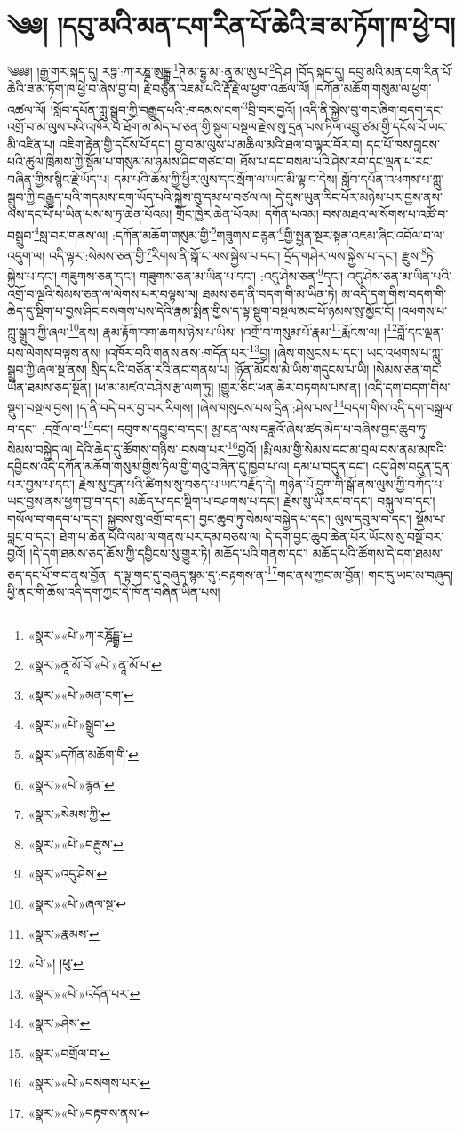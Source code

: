 \chapter{༄༅། །དབུ་མའི་མན་ངག་རིན་པོ་ཆེའི་ཟ་མ་ཏོག་ཁ་ཕྱེ་བ།}༄༅༅། །རྒྱ་གར་སྐད་དུ། རཏྣ་:ཀ་རཎྜ་ཨུངྒྷ་\footnote{«སྣར་»«པེ་»ཀ་རཎྜོངྒྷ་}ཊེ་མ་དྷྱ་མ་:ནཱ་མ་ཨུ་པ་\footnote{«སྣར་»ནཱ་མོ་བོ་«པེ་»ནཱ་མོ་པ་}དེ་ཤ །བོད་སྐད་དུ། དབུ་མའི་མན་ངག་རིན་པོ་ཆེའི་ཟ་མ་ཏོག་ཁ་ཕྱེ་བ་ཞེས་བྱ་བ། རྗེ་བཙུན་འཇམ་པའི་རྡོ་རྗེ་ལ་ཕྱག་འཚལ་ལོ། །དཀོན་མཆོག་གསུམ་ལ་ཕྱག་འཚལ་ལོ། །སློབ་དཔོན་ཀླུ་སྒྲུབ་ཀྱི་བརྒྱུད་པའི་:གདམས་ངག་\footnote{«སྣར་»«པེ་»མན་ངག་}བྲི་བར་བྱའོ། །འདི་ནི་སྐྱེས་བུ་གང་ཞིག་བདག་དང་འགྲོ་བ་མ་ལུས་པའི་འཁོར་བ་ཐོག་མ་མེད་པ་ཅན་གྱི་སྡུག་བསྔལ་རྗེས་སུ་དྲན་པས་ཏིལ་འབྲུ་ཙམ་གྱི་དངོས་པོ་ཡང་མི་འཛིན་པ། འཇིག་རྟེན་གྱི་དངོས་པོ་དང་། བྱ་བ་མ་ལུས་པ་མཆིལ་མའི་ཐལ་བ་ལྟར་བོར་བ། དང་པོ་ཁས་བླངས་པའི་ཚུལ་ཁྲིམས་ཀྱི་སྡོམ་པ་གསུམ་མ་ཉམས་ཤིང་གཙང་བ། ཐོས་པ་དང་བསམ་པའི་ཤེས་རབ་དང་ལྡན་པ་རང་བཞིན་གྱིས་སྙིང་རྗེ་ཡོད་པ། དམ་པའི་ཆོས་ཀྱི་ཕྱིར་ལུས་དང་སྲོག་ལ་ཡང་མི་ལྟ་བ་དེས། སློབ་དཔོན་འཕགས་པ་ཀླུ་སྒྲུབ་ཀྱི་བརྒྱུད་པའི་གདམས་ངག་ཡོད་པའི་སྐྱེས་བུ་དམ་པ་བཙལ་ལ། དེ་དུས་ཡུན་རིང་པོར་མཉེས་པར་བྱས་ནས་ལས་དང་པོ་པ་ཡིན་པས་ས་ཏྲ་ཆེན་པོའམ། གྲོང་ཁྱེར་ཆེན་པོའམ། དགོན་པའམ། བས་མཐའ་ལ་སོགས་པ་འཚོ་བ་བསྒྲུབ་\footnote{«སྣར་»«པེ་»སྒྲུབ་}སླ་བར་གནས་ལ། :དཀོན་མཆོག་གསུམ་གྱི་\footnote{«སྣར་»དཀོན་མཆོག་གི་}གཟུགས་བརྙན་\footnote{«སྣར་»«པེ་»རྙན་}གྱི་སྤྱན་སྔར་སྟན་འཇམ་ཞིང་འབོལ་བ་ལ་འདུག་ལ། འདི་ལྟར་:སེམས་ཅན་གྱི་\footnote{«སྣར་»སེམས་ཀྱི་}རིགས་ནི་སྒོ་ང་ལས་སྐྱེས་པ་དང་། དྲོད་གཤེར་ལས་སྐྱེས་པ་དང་། རྫུས་\footnote{«སྣར་»«པེ་»བརྫུས་}ཏེ་སྐྱེས་པ་དང་། གཟུགས་ཅན་དང་། གཟུགས་ཅན་མ་ཡིན་པ་དང་། :འདུ་ཤེས་ཅན་\footnote{«སྣར་»འདུ་ཤེས་}དང་། འདུ་ཤེས་ཅན་མ་ཡིན་པའི་འགྲོ་བ་ལྔའི་སེམས་ཅན་ལ་ལེགས་པར་བལྟས་ལ། ཐམས་ཅད་ནི་བདག་གི་མ་ཡིན་ཏེ། མ་འདི་དག་གིས་བདག་གི་ཆེད་དུ་སྡིག་པ་བྱས་ཤིང་བསགས་པས་དེའི་རྣམ་སྨིན་གྱིས་ད་ལྟ་སྡུག་བསྔལ་མང་པོ་ཉམས་སུ་མྱོང་ངོ། །འཕགས་པ་ཀླུ་སྒྲུབ་ཀྱི་ཞལ་\footnote{«སྣར་»«པེ་»ཞལ་སྔ་}ནས། རྣམ་རྟོག་བག་ཆགས་ཉེས་པ་ཡིས། །འགྲོ་བ་གསུམ་པོ་རྣམ་\footnote{«སྣར་»རྣམས་}རྨོངས་ལ། །\footnote{«པེ་»། །ཕུ་}བློ་དང་ལྡན་པས་ལེགས་བལྟས་ནས། །འཁོར་བའི་གནས་ནས་:གདོན་པར་\footnote{«སྣར་»«པེ་»འདོན་པར་}བྱ། །ཞེས་གསུངས་པ་དང་། ཡང་འཕགས་པ་ཀླུ་སྒྲུབ་ཀྱི་ཞལ་སྔ་ནས། སྲིད་པའི་བཙོན་རའི་ནང་གནས་པ། །ཉོན་མོངས་མེ་ཡིས་གདུངས་པ་ཡི། །སེམས་ཅན་གང་ཡིན་ཐམས་ཅད་སྔོན། །ཕ་མ་མཛའ་བཤེས་རྩ་ལག་ཏུ། །གྱུར་ཅིང་ཕན་ཆེར་བཏགས་པས་ན། །འདི་དག་བདག་གིས་སྡུག་བསྔལ་བྱས། །ད་ནི་བདེ་བར་བྱ་བར་རིགས། །ཞེས་གསུངས་པས་དྲིན་:ཤེས་པས་\footnote{«སྣར་»ཤེས་}བདག་གིས་འདི་དག་བསྒྲལ་བ་དང་། :དགྲོལ་བ་\footnote{«སྣར་»བགྲོལ་བ་}དང་། དབུགས་དབྱུང་བ་དང་། མྱ་ངན་ལས་བཟླའོ་ཞེས་ཚད་མེད་པ་བཞིས་བྱང་ཆུབ་ཏུ་སེམས་བསྐྱེད་ལ། དེའི་ཆེད་དུ་ཚོགས་གཉིས་:བསག་པར་\footnote{«སྣར་»«པེ་»བསགས་པར་}བྱའོ། །རྨི་ལམ་གྱི་སེམས་དང་མ་བྲལ་བས་ནམ་མཁའི་དབྱིངས་འདི་དཀོན་མཆོག་གསུམ་གྱིས་ཏིལ་གྱི་གའུ་བཞིན་དུ་ཁྱབ་པ་ལ། དམ་པ་བདུན་དང་། འདུ་ཤེས་བདུན་དྲན་པར་བྱས་པ་དང་། རྗེས་སུ་དྲན་པའི་ཚིགས་སུ་བཅད་པ་ཡང་བརྗོད་དེ། གཉེན་པོ་དྲུག་གི་སྒོ་ནས་ལུས་ཀྱི་བཀོད་པ་ཡང་བྱས་ནས་ཕྱག་བྱ་བ་དང་། མཆོད་པ་དང་སྡིག་པ་བཤགས་པ་དང་། རྗེས་སུ་ཡི་རང་བ་དང་། བསྐུལ་བ་དང་། གསོལ་བ་གདབ་པ་དང་། སྐྱབས་སུ་འགྲོ་བ་དང་། བྱང་ཆུབ་ཏུ་སེམས་བསྐྱེད་པ་དང་། ལུས་དབུལ་བ་དང་། སྡོམ་པ་བླང་བ་དང་། ཐེག་པ་ཆེན་པོའི་ལམ་ལ་གནས་པར་དམ་བཅས་ལ། དེ་དག་བྱང་ཆུབ་ཆེན་པོར་ཡོངས་སུ་བསྔོ་བར་བྱའོ། །དེ་དག་ཐམས་ཅད་ཆོས་ཀྱི་དབྱིངས་སུ་གྱུར་ཏེ། མཆོད་པའི་གནས་དང་། མཆོད་པའི་ཚོགས་དེ་དག་ཐམས་ཅད་དང་པོ་གང་ནས་བྱོན། ད་ལྟ་གང་དུ་བཞུད་སྙམ་དུ་:བརྟགས་ན་\footnote{«སྣར་»«པེ་»བརྟགས་ནས་}གང་ནས་ཀྱང་མ་བྱོན། གང་དུ་ཡང་མ་བཞུད། ཕྱི་ནང་གི་ཆོས་འདི་དག་ཀྱང་དེ་ཁོ་ན་བཞིན་ཡིན་པས། 